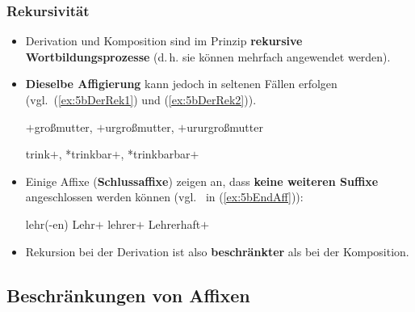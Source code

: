 \begin{frame}
\frametitle{Rekursivität}

\begin{itemize}
\item Derivation und Komposition sind im Prinzip \textbf{rekursive Wortbildungsprozesse} (d.\,h. sie können mehrfach angewendet werden). 

\item \textbf{Dieselbe Affigierung} kann jedoch in seltenen Fällen erfolgen\\
(vgl.\ (\ref{ex:5bDerRek1}) und (\ref{ex:5bDerRek2})).

\ea 
\ea\label{ex:5bDerRek1} $+$großmutter, $+$urgroßmutter, $+$ururgroßmutter

\ex\label{ex:5bDerRek2} trink$+$, *trinkbar$+$, *trinkbarbar$+$
\z 
\z 

\pause 

\item Einige Affixe (\textbf{Schlussaffixe}) zeigen an, dass \textbf{keine weiteren Suffixe} angeschlossen werden können (vgl.\  in (\ref{ex:5bEndAff})):

\ea\label{ex:5bEndAff} lehr(-en) \ras Lehr$+$ \ras lehrer$+$ \ras Lehrerhaft$+$
\z

\item Rekursion bei der Derivation ist also \textbf{beschränkter} als bei der Komposition.

\end{itemize}


\end{frame}


\subsection{Beschränkungen von Affixen}

